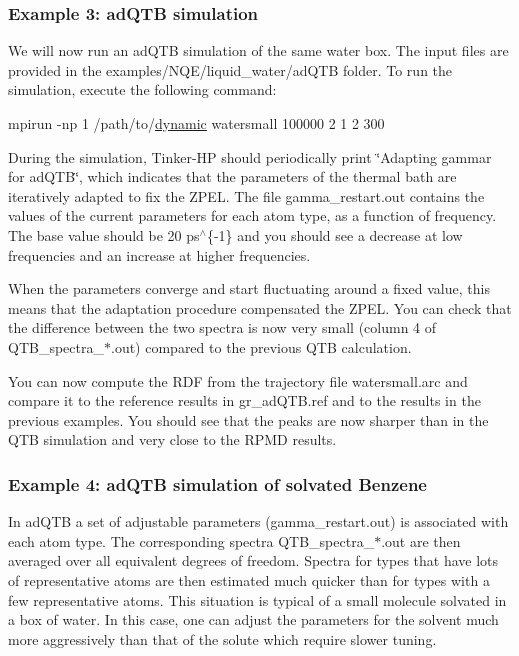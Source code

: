 \subsubsection*{Example 3\-: ad\-Q\-T\-B simulation}

We will now run an ad\-Q\-T\-B simulation of the same water box. The input files are provided in the {\ttfamily examples/\-N\-Q\-E/liquid\-\_\-water/ad\-Q\-T\-B} folder. To run the simulation, execute the following command\-:


\begin{DoxyCode}
mpirun -np 1 /path/to/\hyperlink{dynamic_8f90_a242c646ad028ae81e8a4bed2193eae5d}{dynamic} watersmall 100000 2 1 2 300
\end{DoxyCode}


During the simulation, Tinker-\/\-H\-P should periodically print \char`\"{}\-Adapting gammar for ad\-Q\-T\-B\char`\"{}, which indicates that the parameters of the thermal bath are iteratively adapted to fix the Z\-P\-E\-L. The file {\ttfamily gamma\-\_\-restart.\-out} contains the values of the current parameters for each atom type, as a function of frequency. The base value should be 20 ps$^\wedge$\{-\/1\} and you should see a decrease at low frequencies and an increase at higher frequencies.

When the parameters converge and start fluctuating around a fixed value, this means that the adaptation procedure compensated the Z\-P\-E\-L. You can check that the difference between the two spectra is now very small (column 4 of {\ttfamily Q\-T\-B\-\_\-spectra\-\_\-$\ast$.out}) compared to the previous Q\-T\-B calculation.

You can now compute the R\-D\-F from the trajectory file {\ttfamily watersmall.\-arc} and compare it to the reference results in {\ttfamily gr\-\_\-ad\-Q\-T\-B.\-ref} and to the results in the previous examples. You should see that the peaks are now sharper than in the Q\-T\-B simulation and very close to the R\-P\-M\-D results.

\subsubsection*{Example 4\-: ad\-Q\-T\-B simulation of solvated Benzene}

In ad\-Q\-T\-B a set of adjustable parameters ({\ttfamily gamma\-\_\-restart.\-out}) is associated with each atom type. The corresponding spectra {\ttfamily Q\-T\-B\-\_\-spectra\-\_\-$\ast$.out} are then averaged over all equivalent degrees of freedom. Spectra for types that have lots of representative atoms are then estimated much quicker than for types with a few representative atoms. This situation is typical of a small molecule solvated in a box of water. In this case, one can adjust the parameters for the solvent much more aggressively than that of the solute which require slower tuning.

